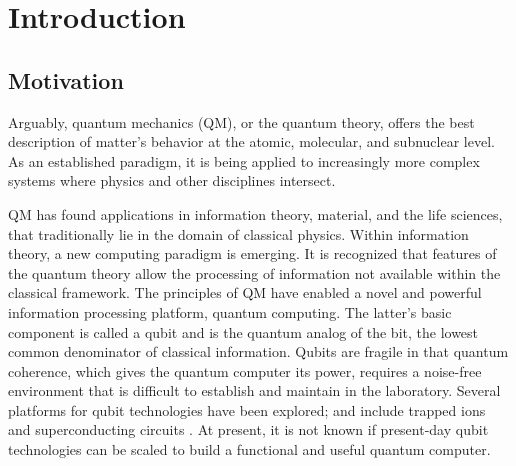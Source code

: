 \selectfont
\setcounter{chapter}{0}
\chapter{Introduction}

\label{introduction}
 
\section{Motivation}
Arguably, quantum mechanics (QM), or the quantum theory, offers the best description of matter's behavior at the atomic, molecular, and subnuclear level. As an established paradigm, it is being applied to increasingly more complex systems where physics and other disciplines intersect.

QM has found applications in information theory, material, and the life sciences, that traditionally lie in the domain of classical physics. Within information theory, a new computing paradigm is emerging. It is recognized that features of the quantum theory allow the processing of information \cite{QIP} not available within the classical framework.
The principles of QM have enabled a novel and powerful information processing platform, quantum computing. The latter's basic component is called a qubit \cite{quits} and is the quantum analog of the bit, the lowest common denominator of classical information. Qubits are fragile in that quantum coherence, which gives the quantum computer its power, requires a noise-free environment that is difficult to establish and maintain in the laboratory. Several platforms for qubit technologies have been explored; and
include trapped ions and superconducting circuits \cite{qubits2}. At present, it is not known if present-day qubit technologies can be scaled to build a functional and useful quantum computer.

